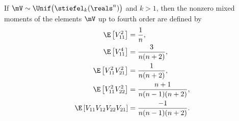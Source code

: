 \begin{lemma}\label{L:stiefel-k-moments}
    If $\mV \sim \Unif\big( \stiefel_k(\reals^n) \big)$ and $k > 1$, then the
    nonzero mixed moments of the elements $\mV$ up to fourth order
    are defined by
    \begin{subequations}
    \begin{align*}
        \E \left[ V_{11}^2 \right] 
            &= 
                \frac{1}{ n }, \\
        \E \left[ V_{11}^4 \right] 
            &=
                \frac{3}{ n (n+2) }, \\
        \E \left[ V_{11}^2 V_{21}^2 \right] 
            &= 
                \frac{1}{ n (n+2) }, \\
        \E \left[ V_{11}^2 V_{22}^2 \right]
            &= 
                \frac{n+1}{ n (n-1) (n+2) }, \\
        \E \left[ V_{11} V_{12} V_{22} V_{21} \right] 
            &= 
                \frac{ -1 }{ n (n-1) (n+2) }.
    \end{align*}
    \end{subequations}
\end{lemma}
